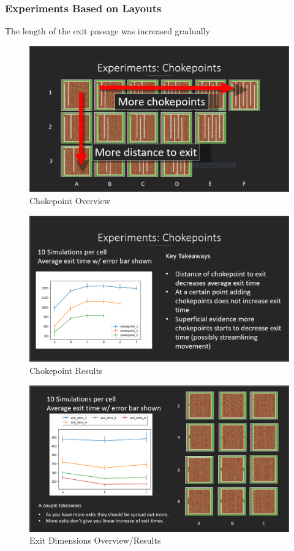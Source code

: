 \documentclass[12pt,letterpaper]{article}
\begin{document}
\subsubsection{Experiments Based on Layouts}
The length of the exit passage was increased gradually
\begin{figure}
  \includegraphics[width=\linewidth]{./figures/chokepoints_summary.png}
  \caption{Chokepoint Overview}
\end{figure}
\begin{figure}
  \includegraphics[width=\linewidth]{./figures/chokepoints_chart.png}
  \caption{Chokepoint Results}
\end{figure}
\begin{figure}
  \includegraphics[width=\linewidth]{./figures/exit_dims_summary.png}
  \caption{Exit Dimensions Overview/Results}
\end{figure}
\end{document}
